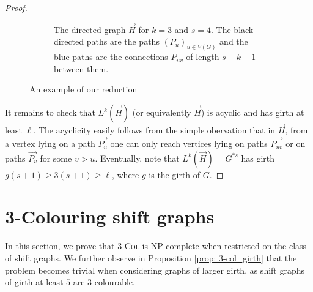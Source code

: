 \documentclass[11pt,a4aper]{article}
\renewcommand{\ge}{\geqslant}
\DeclareRobustCommand*{\ora}{\overrightarrow}
\newcommand*{\orH}{\ora{H}}
\newcommand*{\Col}
{\textsc{3-Col} }
\begin{document}
\begin{proof}
\begin{figure}[h!]
\begin{subfigure}[t]{.65\textwidth}
      \caption{The directed graph $\orH$ for $k = 3$ and $s = 4$. The black directed paths
        are the paths $(P_u)_{u \in V(G)}$ and the blue paths are the
        connections $P_{uv}$ of length $s - k +1$ between them.}
    \end{subfigure}
    \caption{An example of our reduction}
    \label{fig:MIS}
  \end{figure}

  It remains to check that $L^k(\orH)$ (or equivalently $\orH$) is acyclic and has girth at least $\ell$. The acyclicity easily follows from the simple obervation that in $\orH$, from a vertex lying on a path $\ora{P_u}$ one can only reach vertices lying on paths $\ora{P_{uv}}$ or on paths $\ora{P_v}$ for some $v>u$. Eventually, note that $L^k(\orH) = G^{\ast
    s}$ has girth $g(s+1) \ge 3(s+1) \ge \ell$, where $g$ is the girth of $G$.
\end{proof}

\section{3-Colouring shift graphs}\label{sec:3COL}
In this section, we prove that \Col is NP-complete when restricted on the class of shift graphs. We further observe in Proposition \ref{prop: 3-col_girth} that the problem becomes trivial when considering graphs of larger girth, as shift graphs of girth at least $5$ are $3$-colourable.
 
\end{document}
